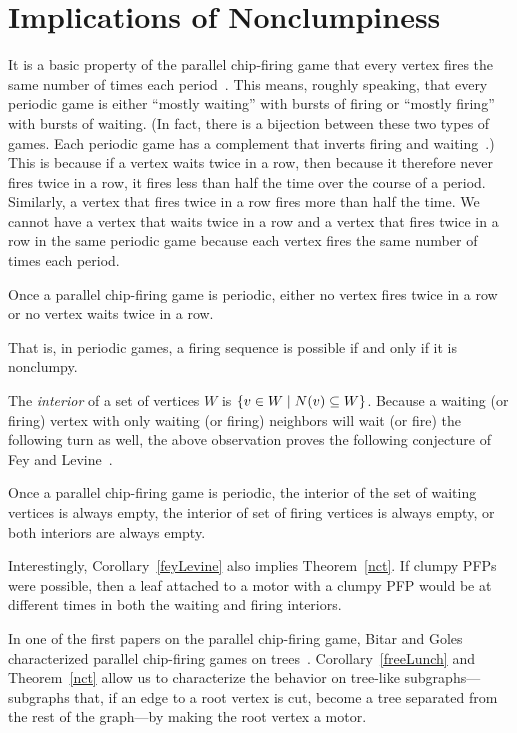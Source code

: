\section{Implications of Nonclumpiness} \label{corollaries}
It is a basic property of the parallel chip-firing game that every vertex fires
the same number of times each period~\cite{jiang}. This means, roughly
speaking, that every periodic game is either ``mostly waiting'' with bursts of
firing or ``mostly firing'' with bursts of waiting. (In fact, there is a
bijection between these two types of games. Each periodic game has a complement
that inverts firing and waiting~\cite{jiang}.) This is because if a vertex
waits twice in a row, then because it therefore never fires twice in a row, it
fires less than half the time over the course of a period. Similarly, a vertex
that fires twice in a row fires more than half the time. We cannot have a
vertex that waits twice in a row and a vertex that fires twice in a row in the
same periodic game because each vertex fires the same number of times each
period.

\begin{cor}
Once a parallel chip-firing game is periodic, either no vertex fires twice in a
row or no vertex waits twice in a row.
\end{cor}

That is, in periodic games, a firing sequence is possible if and only if it is
nonclumpy.

The \emph{interior} of a set of vertices $W$ is $\set{v \in W}{N(v) \subseteq
  W}$. Because a waiting (or firing) vertex with only waiting (or firing)
neighbors will wait (or fire) the following turn as well, the above observation
proves the following conjecture of Fey and Levine~\cite{privateComms}.

\begin{cor}\label{feyLevine}
Once a parallel chip-firing game is periodic, the interior of the set of
waiting vertices is always empty, the interior of set of firing vertices is
always empty, or both interiors are always empty.
\end{cor}

Interestingly, Corollary~\ref{feyLevine} also implies Theorem~\ref{nct}. If
clumpy PFPs were possible, then a leaf attached to a motor with a clumpy PFP
would be at different times in both the waiting and firing interiors.

In one of the first papers on the parallel chip-firing game, Bitar and Goles
characterized parallel chip-firing games on trees~\cite{bitarGoles}.
Corollary~\ref{freeLunch} and Theorem~\ref{nct} allow us to characterize the
behavior on tree-like subgraphs---subgraphs that, if an edge to a root vertex
is cut, become a tree separated from the rest of the graph---by making the root
vertex a motor.

